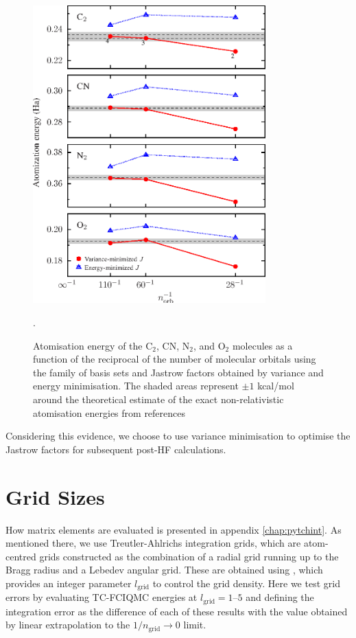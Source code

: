 \begin{figure}[htbp]
    \centering
    \includegraphics[width=0.8\textwidth]{figures/optimisation/Fig/bsdep-dimers-emin}
    \caption{Atomisation energy of the C$_2$, CN, N$_2$, and O$_2$ molecules as a function of the reciprocal of the number of molecular orbitals using the  family of basis sets and Jastrow factors obtained by variance and energy minimisation. The shaded areas represent $\pm 1$ kcal/mol around the theoretical estimate of the exact non-relativistic atomisation energies from references }.
    \label{fig:bsdep-dimers-emin}
\end{figure}

Considering this evidence, we choose to use variance minimisation to optimise the Jastrow factors for subsequent post-HF calculations.

\section{Grid Sizes}

How matrix elements are evaluated is presented in appendix \ref{chap:pytchint}. As mentioned there, we use Treutler-Ahlrichs integration grids,
 which are atom-centred
grids constructed as the combination of a radial grid running up to
the Bragg radius and a Lebedev angular grid. These are obtained using \pyscf, which provides an integer parameter $l_\mathrm{grid}$ to control the grid density. Here we test grid errors by evaluating TC-FCIQMC energies at $l_\mathrm{grid}=1$--$5$ and defining the integration error as the difference of each of these results with the value obtained by linear extrapolation to the $1/n_\mathrm{grid}\to 0$ limit.

